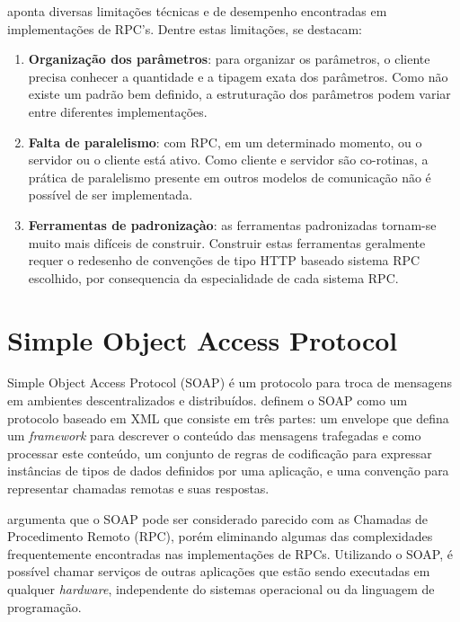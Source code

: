  aponta diversas limitações técnicas e de desempenho encontradas em implementações de RPC's. Dentre estas limitações, se destacam:

\begin{enumerate}[label=\alph*)]

\item \textbf{Organização dos parâmetros}: para organizar os parâmetros, o cliente precisa conhecer a quantidade e a tipagem exata dos parâmetros. Como não existe um padrão bem definido, a estruturação dos parâmetros podem variar entre diferentes implementações.

\item \textbf{Falta de paralelismo}: com RPC, em um determinado momento, ou o servidor ou o cliente está ativo. Como cliente e servidor são co-rotinas, a prática de paralelismo presente em outros modelos de comunicação não é possível de ser implementada.

\item \textbf{Ferramentas de padronizaçào}: as ferramentas padronizadas tornam-se muito mais difíceis de construir. Construir estas ferramentas geralmente requer o redesenho de convenções de tipo HTTP baseado sistema RPC escolhido, por consequencia da especialidade de cada sistema RPC.

\end{enumerate}

\section{Simple Object Access Protocol}\label{sec:soap}

Simple Object Access Protocol (SOAP) é um protocolo para troca de mensagens em ambientes descentralizados e distribuídos.  definem o SOAP como 
um protocolo baseado em XML que consiste em três partes: um envelope que defina um \textit{framework} para descrever o conteúdo das mensagens trafegadas e como processar este conteúdo, um conjunto de regras de codificação para expressar instâncias de tipos de dados definidos por uma aplicação, e uma convenção para representar chamadas remotas e suas respostas.

 argumenta que o SOAP pode ser considerado parecido com as Chamadas de Procedimento Remoto (RPC), porém eliminando algumas das complexidades frequentemente encontradas nas implementações de RPCs. Utilizando o SOAP, é possível chamar serviços de outras aplicações que estão sendo executadas em qualquer \textit{hardware}, independente do sistemas operacional ou da linguagem de programação.

